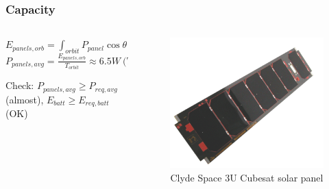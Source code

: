 \documentclass{beamer}
\begin{document}
\begin{frame}
	\frametitle{Capacity}
	\begin{columns}
	\begin{column}{0.5\textwidth}
	$ \displaystyle E_{panels,orb} = \int_{orbit}{P_{panel}\cos\theta \ dt } $
	\newline
	\newline
	$ \displaystyle P_{panels,avg} = \frac{E_{panels,orb}}{T_{orbit}} \approx 6.5 W \ \text{(TBR w/ STK)}$
	
	\begin{center}
	Check: $P_{panels,avg} \geq P_{req,avg}$ (almost), $E_{batt} \geq E_{req,batt}$	(OK)
	\end{center}
	
	\end{column}
	
	\begin{column}{0.5\textwidth}
	
	\begin{figure}%
	\includegraphics[width=\columnwidth]{img/Panel}%
	\caption{Clyde Space 3U Cubesat solar panel}%
	\label{}%
	\end{figure}
	\end{column}
	
	\end{columns}
	
\end{frame}
\end{document}
